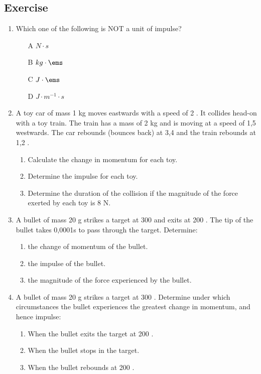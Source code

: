 \subsection{Exercise}
\begin{enumerate}
\item {Which one of the following is NOT a unit of impulse?
\begin{enumerate}
\item [A] $N \cdot s$
\item [B] $kg \cdot \ems$
\item [C] $J \cdot \ems$
\item [D] $J \cdot m^{-1} \cdot s$
\end{enumerate}}
\item {A toy car of mass 1 kg moves eastwards with a speed of 2 \ms.  It collides head-on with a toy train.  The train has a mass of 2 kg and is moving at a speed of 1,5 \ms westwards.  The car rebounds (bounces back) at 3,4 \ms and the train rebounds at 1,2 \ms.
\begin{enumerate}
\item Calculate the change in momentum for each toy.
\item Determine the impulse for each toy.
\item Determine the duration of the collision if the magnitude of the force exerted by each toy is 8 N.
\end{enumerate}
}
\item {A bullet of mass 20 g strikes a target at 300 \ms and exits at 200 \ms.  The tip of the bullet takes 0,0001s to pass through the target.  Determine:
\begin{enumerate}
\item the change of momentum of the bullet.
\item the impulse of the bullet.
\item the magnitude of the force experienced by the bullet.
\end{enumerate}}

\item {A bullet of mass 20 g strikes a target at 300 \ms.  Determine under which circumstances the bullet experiences the greatest change in momentum, and hence impulse:
\begin{enumerate}
\item When the bullet exits the target at 200 \ms.
\item When the bullet stops in the target.
\item When the bullet rebounds at 200 \ms.
\end{enumerate}}


\end{enumerate}
